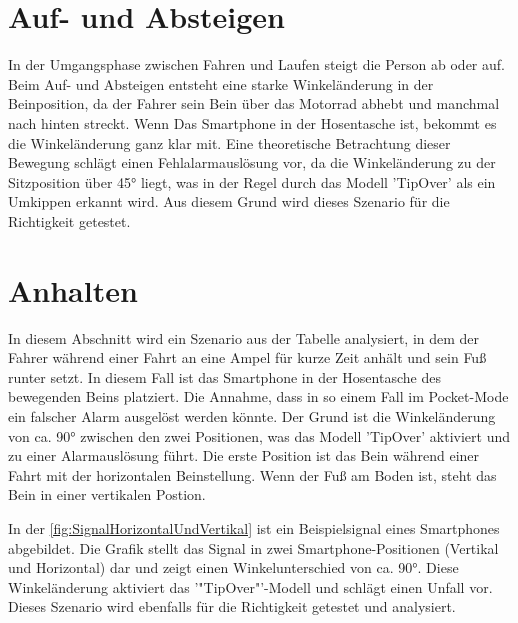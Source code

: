 \section{Auf- und Absteigen} \label{sec:AufAbsteigen} %
In der Umgangsphase zwischen Fahren und Laufen steigt die Person ab oder auf. Beim Auf- und Absteigen entsteht eine starke Winkeländerung in der Beinposition, da der Fahrer sein Bein über das Motorrad abhebt und manchmal nach hinten streckt. Wenn Das Smartphone in der Hosentasche ist, bekommt es die Winkeländerung ganz klar mit.
Eine theoretische Betrachtung dieser Bewegung schlägt einen Fehlalarmauslösung vor, da die Winkeländerung zu der Sitzposition über \ang{45} liegt, was in der Regel durch das Modell 'TipOver' als ein Umkippen erkannt wird.
Aus diesem Grund wird dieses Szenario für die Richtigkeit getestet.






\section{Anhalten} \label{sec:AmpelStehen} %
In diesem Abschnitt wird ein Szenario aus der Tabelle analysiert, in dem der Fahrer während einer Fahrt an eine Ampel für kurze Zeit anhält und sein Fuß runter setzt. In diesem Fall ist das Smartphone in der Hosentasche des bewegenden Beins platziert.
Die Annahme, dass in so einem Fall im Pocket-Mode ein falscher Alarm ausgelöst werden könnte. Der Grund ist die Winkeländerung von ca. \ang{90} zwischen den zwei Positionen, was das Modell 'TipOver' aktiviert und zu einer Alarmauslösung führt.
Die erste Position ist das Bein während einer Fahrt mit der horizontalen Beinstellung. Wenn der Fuß am Boden ist, steht das Bein in einer vertikalen Postion.

In der \autoref{fig:SignalHorizontalUndVertikal} ist ein Beispielsignal eines Smartphones abgebildet. Die Grafik stellt das Signal in zwei Smartphone-Positionen (Vertikal und Horizontal) dar und zeigt einen Winkelunterschied von ca. \ang{90}. Diese Winkeländerung aktiviert das '"TipOver"'-Modell und schlägt einen Unfall vor.
Dieses Szenario wird ebenfalls für die Richtigkeit getestet und analysiert.

